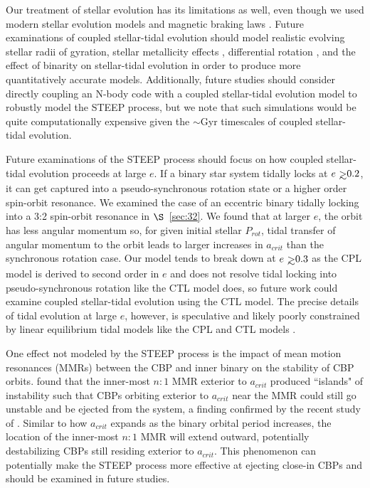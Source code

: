 Our treatment of stellar evolution has its limitations as well, even though we used modern stellar evolution models \citep{Baraffe2015} and magnetic braking laws \citep{Reiners2012,Repetto2014}.  Future examinations of coupled stellar-tidal evolution should model realistic evolving stellar radii of gyration, stellar metallicity effects \citep[e.g.][]{Bolmont2017}, differential rotation \citep[e.g.][]{Lanza2016}, and the effect of binarity on stellar-tidal evolution in order to produce more quantitatively accurate models.  Additionally, future studies should consider directly coupling an N-body code with a coupled stellar-tidal evolution model to robustly model the STEEP process, but we note that such simulations would be quite computationally expensive given the ${\sim}$Gyr timescales of coupled stellar-tidal evolution.

Future examinations of the STEEP process should focus on how coupled stellar-tidal evolution proceeds at large $e$.  If a binary star system tidally locks at $e \gsim 0.2$, it can get captured into a pseudo-synchronous rotation state or a higher order spin-orbit resonance.  We examined the case of an eccentric binary tidally locking into a 3:2 spin-orbit resonance in $\S$~\ref{sec:32}.  We found that at larger $e$, the orbit has less angular momentum so, for given initial stellar $P_{rot}$, tidal transfer of angular momentum to the orbit leads to larger increases in $a_{crit}$ than the synchronous rotation case.  Our model tends to break down at $e \gsim 0.3$ as the CPL model is derived to second order in $e$ and does not resolve tidal locking into pseudo-synchronous rotation like the CTL model does, so future work could examine coupled stellar-tidal evolution using the CTL model.  The precise details of tidal evolution at large $e$, however, is speculative and likely poorly constrained by linear equilibrium tidal models like the CPL and CTL models \citep[e.g.][]{FerrazMello2008,Greenberg2009}.

One effect not modeled by the STEEP process is the impact of mean motion resonances (MMRs) between the CBP and inner binary on the stability of CBP orbits.  \citet{Holman1999} found that the inner-most $n:1$ MMR exterior to $a_{crit}$ produced ``islands" of instability such that CBPs orbiting exterior to $a_{crit}$ near the MMR could still go unstable and be ejected from the system, a finding confirmed by the recent study of \citet{Lam2018}.  Similar to how $a_{crit}$ expands as the binary orbital period increases, the location of the inner-most $n:1$ MMR will extend outward, potentially destabilizing CBPs still residing exterior to $a_{crit}$.  This phenomenon can potentially make the STEEP process more effective at ejecting close-in CBPs and should be examined in future studies.

